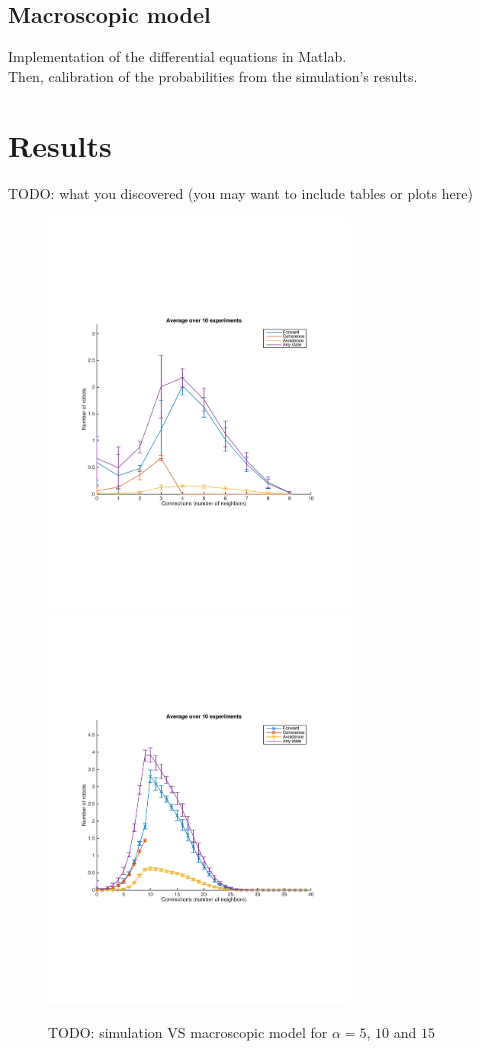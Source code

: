 \documentclass[a4paper, 10pt, conference]{ieeeconf}
\begin{document}
  \subsection{Macroscopic model}
  Implementation of the differential equations in Matlab.\\
  Then, calibration of the probabilities from the simulation's results.

\section{Results}
  TODO: what you discovered (you may want to include tables or plots here)\\

  \begin{figure}[h]
    \begin{center}
      \includegraphics[width=8cm]{figures/simulation-10-alpha4.pdf}
      \includegraphics[width=8cm]{figures/simulation-40-alpha10.pdf}
      \caption{TODO: simulation VS macroscopic model for $\alpha = 5$, $10$ and $15$}
    \end{center}
  \end{figure}
\end{document}
